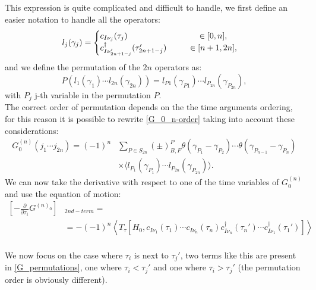 This expression is quite complicated and difficult to handle, we first define an easier notation to handle all the operators:
\begin{equation}
    l_j(\gamma_j) = 
    \begin{cases}
        c_{I\nu_j}(\tau_j)\hspace{2.95cm}\in[0,n], \\
        c^\dagger_{I\nu_{2n+1-j}'}(\tau_{2n+1-j}')\hspace{0.9cm}\in[n+1,2n],
    \end{cases}
    \label{eq:signfunction}
\end{equation}
and we define the permutation of the $2n$ operators as:
\begin{equation}
    P(l_1(\gamma_1)\cdots l_{2n}(\gamma_{2n}))=l_{P1}(\gamma_{P1})\cdots l_{P_{2n}}(\gamma_{P_{2n}}),
\end{equation}
with $P_j$ j-th variable in the permutation $P$.\\
The correct order of permutation depends on the the time arguments ordering, for this reason it is possible to rewrite \ref{G_0_n-order} 
taking into account these considerations:
\begin{equation}
\begin{split}
    G^{(n)}_0(j_1\cdots j_{2n})=(-1)^n&\sum_{P\in S_{2n}}(\pm)^{P}_{B,F}\theta(\gamma_{P_1}-\gamma_{P_2})\cdots\theta(\gamma_{P_{n-1}}-\gamma_{P_n})\\
    &\times\langle l_{P_1}(\gamma_{P_1})\cdots l_{P_{2n}}(\gamma_{P_{2n}})\rangle.
\end{split}
\label{G_permutations}
\end{equation}
We can now take the derivative with respect to one of the time variables of $G^{(n)}_0$ and use the equation of motion:
\begin{equation}
\begin{split}
    \left[-\frac{\partial}{\partial\tau_1}G^{(n)_0}\right]&_{2nd-term}=\\
    &=-(-1)^n\left\langle T_\tau\left[H_0,c_{I\nu_1}(\tau_1)\cdots c_{I\nu_n}(\tau_n)c^\dagger_{I\nu_n}(\tau_n')\cdots c^\dagger_{I\nu_1}(\tau_1')\right]\right\rangle
\end{split}
\end{equation}
\\
We now focus on the case where $\tau_i$ is next to $\tau_j'$, two terms like this are present in \ref{G_permutations}, one where $\tau_i<\tau_j'$ and one where 
$\tau_i>\tau_j'$ (the permutation order is obviously different).\\
